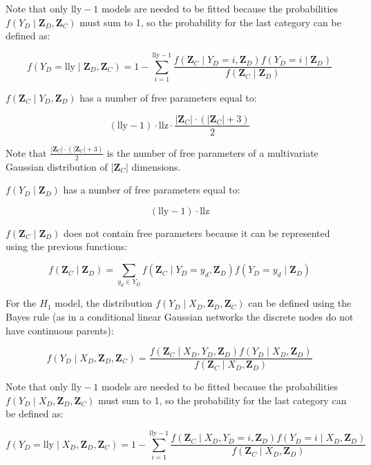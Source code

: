 \documentclass[12pt]{article}
\newcommand{\zd}{\mathbf{Z}_D}
\newcommand{\zc}{\mathbf{Z}_C}
\newcommand{\z}{\mathbf{Z}_D, \mathbf{Z}_C}
\begin{document}
Note that only $\text{lly} - 1$ models are needed to be fitted because the probabilities $f(Y_D \mid \z)$ must sum to 1, so the probability for the last category can be defined as:

\begin{equation}
f(Y_D = \text{lly}\mid \z) = 1 - \sum\limits_{i = 1}^{\text{lly} - 1}\frac{f(\zc \mid Y_D = i, \zd) f(Y_D = i \mid \zd)}{f(\zc \mid \zd)}
\end{equation}


$f(\zc \mid Y_D, \zd)$ has  a number of free parameters equal to:

\begin{equation}
(\text{lly} - 1)\cdot\text{llz}\cdot\frac{\lvert\zc\rvert\cdot(\lvert\zc\rvert + 3)}{2}
\end{equation}

Note that $\frac{\lvert\zc\rvert\cdot(\lvert\zc\rvert + 3)}{2}$ is the number of free parameters of a multivariate Gaussian distribution of $\lvert\zc\rvert$ dimensions.

$f(Y_D \mid \zd)$ has a number of free parameters equal to:

\begin{equation}
(\text{lly} - 1)\cdot \text{llz}
\end{equation}

$f(\zc \mid \zd)$ does not contain free parameters because it can be represented using the previous functions:

\begin{equation}
f(\zc \mid \zd) = \sum\limits_{y_d \in Y_D} f(\zc \mid Y_D = y_d, \zd) f(Y_D = y_d \mid \zd)
\end{equation}

For the $H_1$ model, the distribution $f(Y_D \mid X_D, \z)$ can be defined using the Bayes rule (as in a conditional linear Gaussian networks the discrete nodes do not have continuous parents):

\begin{equation}
f(Y_D \mid X_D, \z) = \frac{f(\zc \mid X_D, Y_D, \zd) f(Y_D \mid X_D, \zd)}{f(\zc \mid X_D, \zd)}
\end{equation}

Note that only $\text{lly} - 1$ models are needed to be fitted because the probabilities $f(Y_D \mid X_D, \z)$ must sum to 1, so the probability for the last category can be defined as:

\begin{equation}
f(Y_D = \text{lly}\mid X_D, \z) = 1 - \sum\limits_{i = 1}^{\text{lly} - 1}\frac{f(\zc \mid X_D, Y_D = i, \zd) f(Y_D = i \mid X_D, \zd)}{f(\zc \mid X_D, \zd)}
\end{equation}
\end{document}
